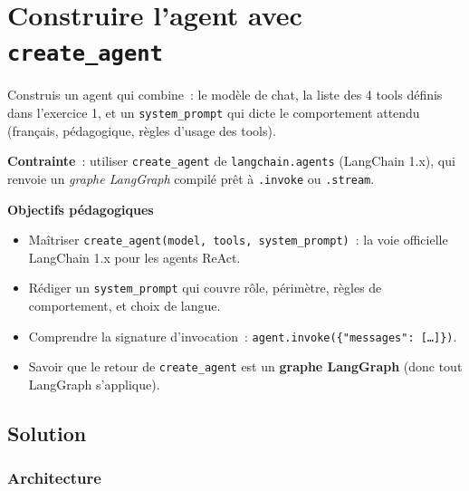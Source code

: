 \documentclass[11pt,a4paper]{article}
\begin{document}
\section{Construire l'agent avec \texttt{create\_agent}}

\begin{tcolorbox}[title=Exercice 2. Assembler les tools dans un agent ReAct]
Construis un agent qui combine~: le modèle de chat, la liste des 4 tools
définis dans l'exercice 1, et un \texttt{system\_prompt} qui dicte le
comportement attendu (français, pédagogique, règles d'usage des tools).

\textbf{Contrainte}~: utiliser \texttt{create\_agent} de
\texttt{langchain.agents} (LangChain 1.x), qui renvoie un \emph{graphe
LangGraph} compilé prêt à \texttt{.invoke} ou \texttt{.stream}.

\bigskip
\noindent\textbf{Objectifs pédagogiques}
\begin{itemize}[leftmargin=*]
  \item Maîtriser \texttt{create\_agent(model, tools, system\_prompt)}~:
        la voie officielle LangChain 1.x pour les agents ReAct.
  \item Rédiger un \texttt{system\_prompt} qui couvre rôle, périmètre,
        règles de comportement, et choix de langue.
  \item Comprendre la signature d'invocation~:
        \texttt{agent.invoke(\{"messages": [\dots]\})}.
  \item Savoir que le retour de \texttt{create\_agent} est un
        \textbf{graphe LangGraph} (donc tout LangGraph s'applique).
\end{itemize}
\end{tcolorbox}

\subsection{Solution}

\subsubsection{Architecture}
\end{document}
